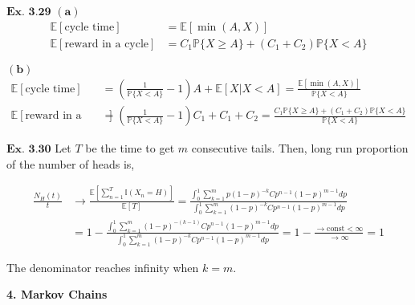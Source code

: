 \documentclass{article}
\begin{document}
\vspace{0.2in}
${\textbf{Ex. 3.29}}$
$\mathbf{(a)}$
\begin{align*}
\mathbb{E}[\text{cycle time}] &= \mathbb{E}[\min(A,X)]\\
\mathbb{E}[\text{reward in a cycle}] &= C_1\mathbb{P}\{X\geq A\} + (C_1+C_2)\mathbb{P}\{X < A\}
\end{align*}

$\mathbf{(b)}$
\begin{align*}
\mathbb{E}[\text{cycle time}] &= \left(\frac{1}{\mathbb{P}\{X<A\}}-1\right)A + \mathbb{E}[X|X<A] = \frac{\mathbb{E}[\min(A,X)]}{\mathbb{P}\{X<A\}}\\
\mathbb{E}[\text{reward in a cycle}] &= \left(\frac{1}{\mathbb{P}\{X<A\}}-1\right)C_1 + C_1+C_2 = \frac{C_1\mathbb{P}\{X\geq A\} + (C_1+C_2)\mathbb{P}\{X < A\}}{\mathbb{P}\{X<A\}}
\end{align*}

\vspace{0.2in}
${\textbf{Ex. 3.30}}$
Let $T$ be the time to get $m$ consecutive tails. Then, long run proportion of the number of heads is,

\begin{align*}
\frac{N_{H}(t)}{t} &\rightarrow \frac{\mathbb{E}[\sum_{n=1}^{T}\mathbb{I}(X_n=H)]}{\mathbb{E}[T]} = \frac{\int_{0}^{1}\sum_{k=1}^{m}p(1-p)^{-k}Cp^{n-1}(1-p)^{m-1}dp}{\int_{0}^{1}\sum_{k=1}^{m}(1-p)^{-k}Cp^{n-1}(1-p)^{m-1}dp}\\
&= 1 - \frac{\int_{0}^{1}\sum_{k=1}^{m}(1-p)^{-(k-1)}Cp^{n-1}(1-p)^{m-1}dp}{\int_{0}^{1}\sum_{k=1}^{m}(1-p)^{-k}Cp^{n-1}(1-p)^{m-1}dp} = 1 - \frac{\rightarrow \text{const}<\infty}{\rightarrow \infty} = 1
\end{align*}

The denominator reaches infinity when $k = m$.

\vspace{0.2in}
\begin{comment}
${\textbf{Ex. 3.31}}$

\vspace{0.2in}
${\textbf{Ex. 3.32}}$

\vspace{0.2in}
${\textbf{Ex. 3.33}}$

\vspace{0.2in}
${\textbf{Ex. 3.34}}$

\vspace{0.2in}
${\textbf{Ex. 3.35}}$

\vspace{0.2in}
${\textbf{Ex. 3.36}}$

\vspace{0.2in}
\end{comment}
\clearpage
\begin{center}
    \textbf{\large{4. Markov Chains}}
\end{center}
\end{document}
